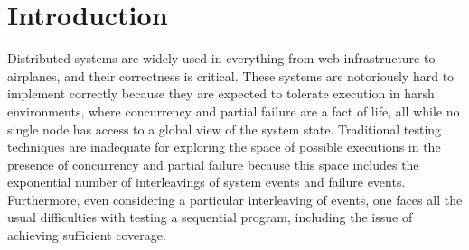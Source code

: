 \chapter{Introduction}
\label{chap:intro}


Distributed systems are widely used
  in everything from web infrastructure to airplanes,
  and their correctness is critical.
These systems are notoriously hard to implement correctly
  because they are expected to tolerate execution in harsh environments,
  where concurrency and partial failure are a fact of life,
  all while no single node has access to a global view of the system state.
Traditional testing techniques are inadequate
  for exploring the space of possible executions
  in the presence of concurrency and partial failure
  because this space includes the exponential number of
  interleavings of system events and failure events.
Furthermore, even considering a particular interleaving of events,
  one faces all the usual difficulties with testing a sequential program,
  including the issue of achieving sufficient coverage.

